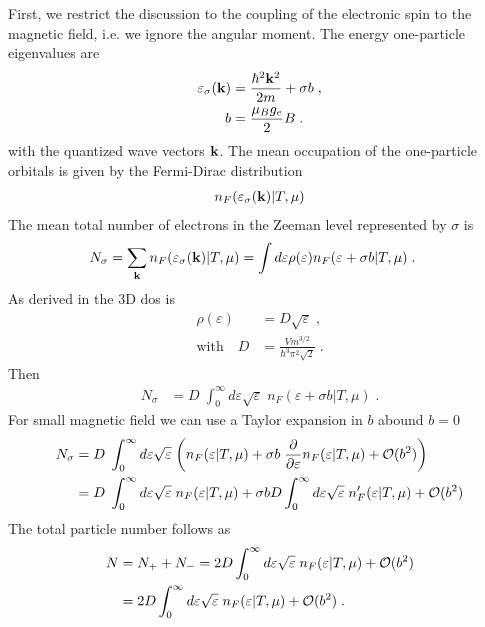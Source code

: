 First, we restrict the discussion to the coupling of the electronic spin to the magnetic field, i.e.
we ignore the angular moment.
The energy one-particle eigenvalues are
%
\begin{align*}
\varepsilon_{\sigma}(\mathbf k) &= \frac{\hbar^{2} \mathbf k^{2}}{2m} +\sigma b\;,\\
b &= \frac{\mu_{B} g_{e} }{2}B\;.
\end{align*}
%
with the quantized wave vectors $\mathbf k$.
The mean occupation of the one-particle orbitals is given by the Fermi-Dirac distribution
%
\begin{align*}
n_{F}(\varepsilon_{\sigma}(\mathbf k)|T,\mu)
\end{align*}
%
The mean total number of electrons in the Zeeman level represented by $\sigma$ is
%
\begin{align*}
N_{\sigma} &=\sum_{\mathbf k} n_{F}(\varepsilon_{\sigma}(\mathbf k)|T,\mu)
= \int d\varepsilon \rho(\varepsilon) n_{F}(\varepsilon +\sigma b|T,\mu)\;.
\end{align*}
%
As derived in  the 3D dos is
%
%
\begin{subequations}\label{eq:para:pauli:1}
\begin{align}
\rho(\varepsilon)&= D \sqrt{\varepsilon}\;,\\
\text{with}\quad D&=\frac{V m^{3/2}}{\hbar^{3} \pi^{2}\sqrt{2}}\;.
\end{align}
\end{subequations}
%
Then
%
\begin{align*}
N_{\sigma} &=D\;
\int_{0}^{\infty} d\varepsilon \sqrt{\varepsilon} \; n_{F}(\varepsilon +\sigma b|T,\mu)\;.
\end{align*}
%
For small magnetic field we can use a Taylor expansion in $b$ abound $b=0$
%
\begin{align*}
N_{\sigma} &=D\;
\int_{0}^{\infty} d\varepsilon \sqrt{\varepsilon} \; 
\bigg(n_{F}(\varepsilon|T,\mu) +\sigma b \;\frac{\partial }{\partial \varepsilon}n_{F}(\varepsilon|T,\mu) +{\cal O}(b^{2})\bigg)\\
 &=D\;
\int_{0}^{\infty} d\varepsilon \sqrt{\varepsilon} \; 
n_{F}(\varepsilon|T,\mu) 
+\sigma b D \int_{0}^{\infty} d\varepsilon \sqrt{\varepsilon} \;n'_{F}(\varepsilon|T,\mu) +{\cal O}(b^{2})
\end{align*}
%
 The total particle number follows as
\begin{align}
N &= N_{+}+N_{-} = 2 D \int_{0}^{\infty} d\varepsilon \sqrt{\varepsilon} \;n_{F}
(\varepsilon|T,\mu) +
{\cal O}(b^{2})\notag\\
&= 2 D \int_{0}^{\infty} d\varepsilon \sqrt{\varepsilon} \;n_{F}
(\varepsilon|T,\mu) +
{\cal O}(b^{2})\;.\label{eq:N:total}
\end{align}
